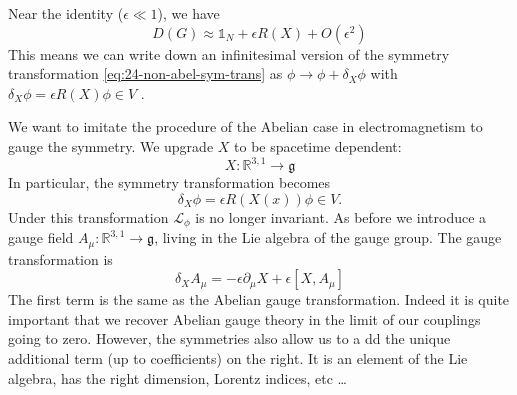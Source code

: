 Near the identity ($\epsilon \ll 1$), we have
\begin{equation}
  D(G) \approx \mathbb{1}_N + \epsilon R(X) + O(\epsilon^2)
\end{equation}
This means we can write down an infinitesimal version of the symmetry transformation \eqref{eq:24-non-abel-sym-trans} as $\phi \to \phi + \delta_X \phi$ with  $\delta_X \phi = \epsilon R(X) \phi \in V$ .

We want to imitate the procedure of the Abelian case in electromagnetism to gauge the symmetry. We upgrade $X$  to be spacetime dependent:
\begin{equation}
  X \colon \mathbb{R}^{3, 1} \to \mathfrak{g}
\end{equation}
In particular, the symmetry transformation becomes
\begin{equation}
  \delta_X\phi = \epsilon R(X(x)) \phi \in V.
\end{equation}
Under this transformation $\mathcal{L}_\phi$  is no longer invariant. As before we introduce a gauge field $A_{\mu} \colon \mathbb{R}^{3, 1} \to \mathfrak{g}$, living in the Lie algebra of the gauge group.
The gauge transformation is
\begin{equation}
  \label{eq:24-gtrans}
  \delta_X A_{\mu} = - \epsilon \partial_{\mu} X + \epsilon [X, A_{\mu}]
\end{equation}
The first term is the same as the Abelian gauge transformation.
Indeed it is quite important that we recover Abelian gauge theory in the limit of our couplings going to zero.
However, the symmetries also allow us to a dd the unique additional term (up to coefficients) on the right.
It is an element of the Lie algebra, has the right dimension, Lorentz indices, etc \dots

